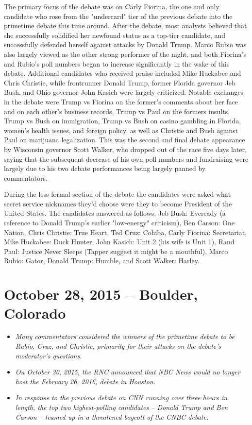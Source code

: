 The primary focus of the debate was on Carly Fiorina, the one and only
candidate who rose from the "undercard" tier of the previous debate into
the primetime debate this time around. After the debate, most analysts
believed that she successfully solidified her newfound status as a
top-tier candidate, and successfully defended herself against attacks by
Donald Trump. Marco Rubio was also largely viewed as the other strong
performer of the night, and both Fiorina's and Rubio's poll numbers
began to increase significantly in the wake of this debate. Additional
candidates who received praise included Mike Huckabee and Chris
Christie, while frontrunner Donald Trump, former Florida governor Jeb
Bush, and Ohio governor John Kasich were largely criticized. Notable
exchanges in the debate were Trump vs Fiorina on the former's comments
about her face and on each other's business records, Trump vs Paul on
the formers insults, Trump vs Bush on immigration, Trump vs Bush on
casino gambling in Florida, women's health issues, and foreign policy,
as well as Christie and Bush against Paul on marijuana legalization.
This was the second and final debate appearance by Wisconsin governor
Scott Walker, who dropped out of the race five days later, saying that
the subsequent decrease of his own poll numbers and fundraising were
largely due to his two debate performances being largely panned by
commentators.

During the less formal section of the debate the candidates were asked
what secret service nicknames they'd choose were they to become
President of the United States. The candidates answered as follows; Jeb
Bush: Eveready (a reference to Donald Trump's earlier "low-energy"
criticism), Ben Carson: One Nation, Chris Christie: True Heart, Ted
Cruz: Cohiba, Carly Fiorina: Secretariat, Mike Huckabee: Duck Hunter,
John Kasich: Unit 2 (his wife is Unit 1), Rand Paul: Justice Never
Sleeps (Tapper suggest it might be a mouthful), Marco Rubio: Gator,
Donald Trump: Humble, and Scott Walker: Harley.

\section{October 28, 2015 -- Boulder,
Colorado}\label{october-28-2015-boulder-colorado}

\begin{itemize}
\item
  \emph{Many commentators considered the winners of the primetime debate
  to be Rubio, Cruz, and Christie, primarily for their attacks on the
  debate's moderator's questions.}
\item
  \emph{On October 30, 2015, the RNC announced that NBC News would no
  longer host the February 26, 2016, debate in Houston.}
\item
  \emph{In response to the previous debate on CNN running over three
  hours in length, the top two highest-polling candidates -- Donald
  Trump and Ben Carson -- teamed up in a threatened boycott of the CNBC
  debate.}
\end{itemize}

